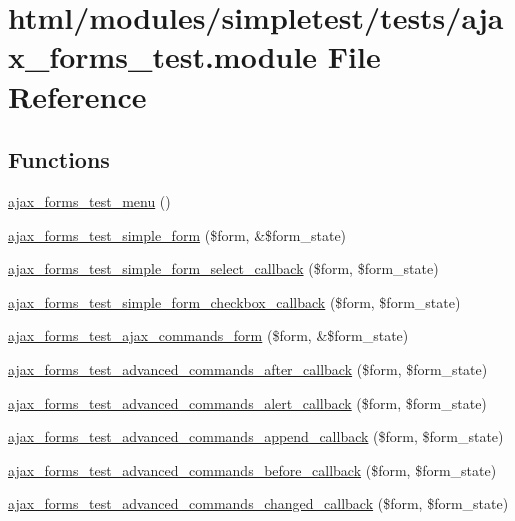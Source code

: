 \hypertarget{ajax__forms__test_8module}{
\section{html/modules/simpletest/tests/ajax\_\-forms\_\-test.module File Reference}
\label{ajax__forms__test_8module}
}
\subsection*{Functions}
\begin{DoxyCompactItemize}
\item 
\hyperlink{ajax__forms__test_8module_ad49111b8b86fa5af3b7e9a0d0570d17a}{ajax\_\-forms\_\-test\_\-menu} ()
\item 
\hyperlink{ajax__forms__test_8module_a012279e867d0f7f4665d6d561f6f7b79}{ajax\_\-forms\_\-test\_\-simple\_\-form} (\$form, \&\$form\_\-state)
\item 
\hyperlink{ajax__forms__test_8module_aa01a2ea5897e682d5b149bca1b5bcaf5}{ajax\_\-forms\_\-test\_\-simple\_\-form\_\-select\_\-callback} (\$form, \$form\_\-state)
\item 
\hyperlink{ajax__forms__test_8module_aead84f727c96c6c9643dcf6dd6b12377}{ajax\_\-forms\_\-test\_\-simple\_\-form\_\-checkbox\_\-callback} (\$form, \$form\_\-state)
\item 
\hyperlink{ajax__forms__test_8module_ac99f404a0844e3198eb97beddc193ee9}{ajax\_\-forms\_\-test\_\-ajax\_\-commands\_\-form} (\$form, \&\$form\_\-state)
\item 
\hyperlink{ajax__forms__test_8module_a981a537893bde0e3c6e052daaffb791d}{ajax\_\-forms\_\-test\_\-advanced\_\-commands\_\-after\_\-callback} (\$form, \$form\_\-state)
\item 
\hyperlink{ajax__forms__test_8module_ae4a6a5f768d406d0cb750c853f227ba9}{ajax\_\-forms\_\-test\_\-advanced\_\-commands\_\-alert\_\-callback} (\$form, \$form\_\-state)
\item 
\hyperlink{ajax__forms__test_8module_a2c0859cd26d7f097e766d35207ab0a93}{ajax\_\-forms\_\-test\_\-advanced\_\-commands\_\-append\_\-callback} (\$form, \$form\_\-state)
\item 
\hyperlink{ajax__forms__test_8module_a28ab6f2c9cd12d81db6e51046ad9677a}{ajax\_\-forms\_\-test\_\-advanced\_\-commands\_\-before\_\-callback} (\$form, \$form\_\-state)
\item 
\hyperlink{ajax__forms__test_8module_ae2eaee511e4451b5877c5fbc8d7bc5ed}{ajax\_\-forms\_\-test\_\-advanced\_\-commands\_\-changed\_\-callback} (\$form, \$form\_\-state)

\end{DoxyCompactItemize}
